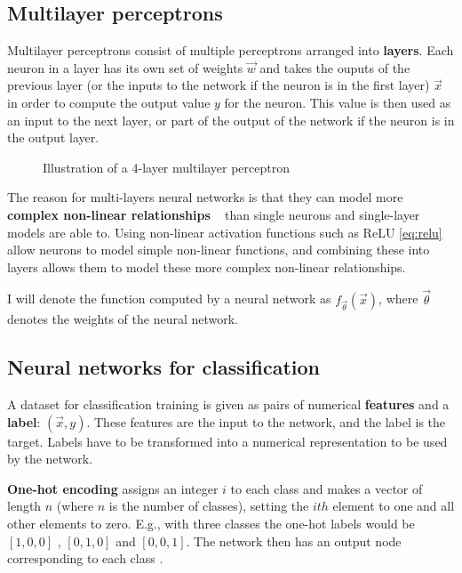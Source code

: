 \subsection{Multilayer perceptrons}

Multilayer perceptrons consist of multiple perceptrons arranged into \textbf{layers}. 
Each neuron in a layer has its own set of weights
$\vec{w}$ and takes the ouputs of the previous layer (or the inputs to the network if the neuron is in the first layer) $\vec{x}$ in order to compute the 
output value $y$ for the neuron. This value is then used as an input to the next layer, or part of the output of the network if the neuron is in
the output layer.
\begin{figure}[H]
  \begin{center}
      \scalebox{.75}{}
      \caption{Illustration of a 4-layer multilayer perceptron}
      \label{fig:illustration_deep_network}
  \end{center}
\end{figure}
 
The reason for multi-layers neural networks is that they can model more \textbf{complex non-linear relationships}
~\cite{Goodfellow-et-al-2016} than single 
neurons and single-layer models are able to. Using non-linear activation functions such as ReLU \eqref{eq:relu} allow neurons to model simple 
non-linear functions, and combining these into layers allows them to model these more complex non-linear relationships.

I will denote the function computed by a neural network as $f_{\vec{\theta}}(\vec{x})$, where $\vec{\theta}$ denotes the
weights of the neural network.

\subsection{Neural networks for classification}

A dataset for classification training is given as pairs of numerical \textbf{features} and a \textbf{label}: $(\vec{x}, y)$. These features are 
the input to the network,
and the label is the target. Labels have to be transformed into a numerical representation to be used by the network.

\textbf{One-hot encoding} assigns an integer $i$ to each class and makes a vector of length $n$ (where $n$ is the 
number of classes), setting the $ith$ element to one and all other elements to zero. E.g., with three classes
the one-hot labels would be $[1, 0, 0]$ , $[0, 1, 0]$ and $[0, 0, 1]$. The network then has an output node corresponding to each class 
\cite{WhyOneHo55:online}.

